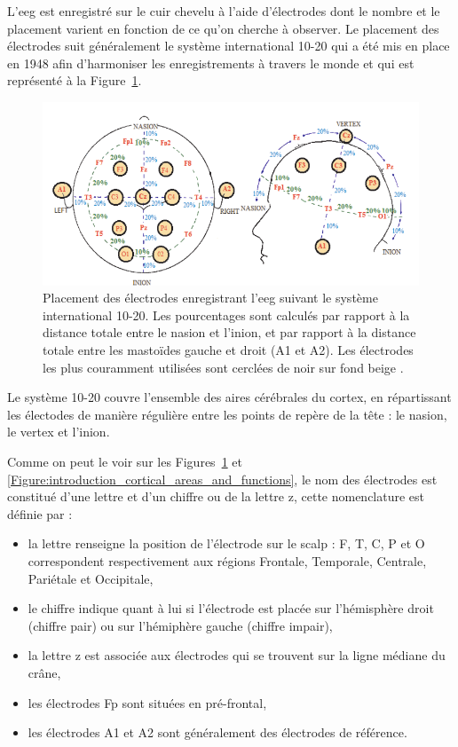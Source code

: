 L'\gls{eeg} est enregistré sur le cuir chevelu à l'aide d'électrodes dont le nombre et le placement varient en fonction de ce qu'on cherche à observer.
Le placement des électrodes suit généralement le système international 10-20 qui a été mis en place en 1948 afin d'harmoniser les enregistrements à travers le monde 
\citep{Jasper1949, Sharbrough1991} et qui est représenté à la Figure~\ref{Figure:introduction_system_10_20}.

\begin{figure}[h!]
  \centering
	\includegraphics[width=1\linewidth]{figures/chapter-1/introduction-system-10-20} 
  \caption{Placement des électrodes enregistrant l'\gls{eeg} suivant le système international 10-20. Les pourcentages sont calculés par rapport à la distance totale entre le nasion
	et l'inion, et par rapport à la distance totale entre les mastoïdes gauche et droit (A1 et A2). Les électrodes les plus couramment utilisées 
	sont cerclées de noir sur fond beige \citep{Marzbani2016}.}
  \label{Figure:introduction_system_10_20}
\end{figure}

Le système 10-20 couvre l'ensemble des aires cérébrales du cortex, en répartissant les électodes de manière régulière entre les points de repère de la tête : le nasion, le vertex et l'inion. 

Comme on peut le voir sur les Figures~\ref{Figure:introduction_system_10_20} et \ref{Figure:introduction_cortical_areas_and_functions}, le nom des électrodes est 
constitué d'une lettre et d'un chiffre ou de la lettre z, cette nomenclature est définie par \citet{Jasper1949} :
\begin{itemize}
\item la lettre renseigne la position de l'électrode sur le scalp : F, T, C, P et O correspondent respectivement aux régions Frontale, Temporale, Centrale, Pariétale et Occipitale,
\item le chiffre indique quant à lui si l'électrode est placée sur l'hémisphère droit (chiffre pair) ou sur l'hémiphère gauche (chiffre impair),
\item la lettre z est associée aux électrodes qui se trouvent sur la ligne médiane du crâne,
\item les électrodes Fp sont situées en pré-frontal,
\item les électrodes A1 et A2 sont généralement des électrodes de référence.
\end{itemize}
  
